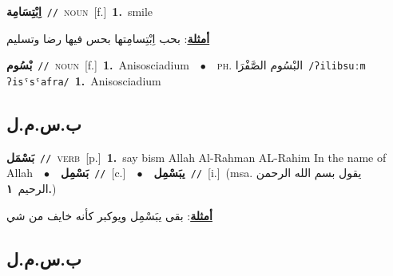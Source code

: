\documentclass[10pt,a4paper,twoside]{article} %
\begin{document}
\begin{multicols}{2}
{\setlength\topsep{0pt}\textbf{\foreignlanguage{arabic}{اِبْتِسَامِة}}\ {\color{gray}\texttt{//}\color{black}}\ \textsc{noun}\ [f.]\ \textbf{1.}~smile\  \begin{flushright}\color{gray}\foreignlanguage{arabic}{\textbf{\underline{\foreignlanguage{arabic}{أمثلة}}}: بحب اِبْتِسامِتها بحس فيها رضا وتسليم}\end{flushright}\color{black}} \vspace{2mm}

{\setlength\topsep{0pt}\textbf{\foreignlanguage{arabic}{بْسُوم}}\ {\color{gray}\texttt{//}\color{black}}\ \textsc{noun}\ [f.]\ \textbf{1.}~Anisosciadium\ \ $\bullet$\ \ \textsc{ph.} \color{gray} \foreignlanguage{arabic}{البْسُوم الصَّفْرَا}\color{black}\ {\color{gray}\texttt{/{\sffamily ʔilibsuːm ʔisˤsˤafra}/}\color{black}}\ \textbf{1.}~Anisosciadium\ } \vspace{2mm}

\vspace{-3mm}
\subsection*{\color{blue}\foreignlanguage{arabic}{ب.س.م.ل}\color{blue}{}} 

{\setlength\topsep{0pt}\textbf{\foreignlanguage{arabic}{بَسْمَل}}\ {\color{gray}\texttt{//}\color{black}}\ \textsc{verb}\ [p.]\ \textbf{1.}~say bism Allah Al-Rahman AL-Rahim In the name of Allah\ \ $\bullet$\ \ \setlength\topsep{0pt}\textbf{\foreignlanguage{arabic}{بَسْمِل}}\ {\color{gray}\texttt{//}\color{black}}\ [c.]\ \ $\bullet$\ \ \setlength\topsep{0pt}\textbf{\foreignlanguage{arabic}{يبَسْمِل}}\ {\color{gray}\texttt{//}\color{black}}\ [i.]\ \color{gray}(msa. \foreignlanguage{arabic}{يقول بسم الله الرحمن الرحيم}~\foreignlanguage{arabic}{\textbf{١.}})\color{black}\  \begin{flushright}\color{gray}\foreignlanguage{arabic}{\textbf{\underline{\foreignlanguage{arabic}{أمثلة}}}: بقى يبَسْمِل ويوكبر كأنه خايف من شي}\end{flushright}\color{black}} \vspace{2mm}

\vspace{-3mm}
\subsection*{\color{blue}\foreignlanguage{arabic}{ب.س.م.ل}\color{blue}{ (ntws)}} 


\end{multicols}
\end{document}
